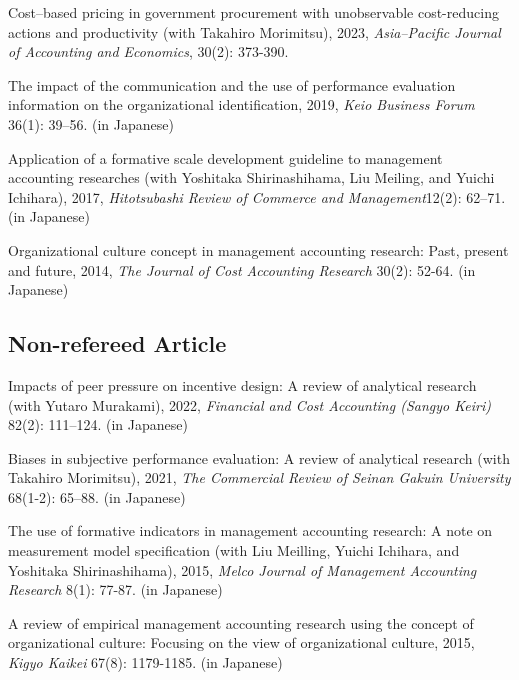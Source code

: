 \documentclass[letterpaper,uplatex]{article}
\renewenvironment{itemize}{
  \begin{list}{}{
    \setlength{\leftmargin}{1.5em}
  }
}{
  \end{list}
}
\begin{document}
\begin{itemize}
    \item Cost--based pricing in government procurement with unobservable cost-reducing actions and productivity (with Takahiro Morimitsu), 2023, \textit{Asia--Pacific Journal of Accounting and Economics}, 30(2): 373-390.
    
    \item The impact of the communication and the use of performance evaluation information on the organizational identification, 2019, \textit{Keio Business Forum} 36(1): 39--56. (in Japanese)

	\item Application of a formative scale development guideline to management accounting researches (with Yoshitaka Shirinashihama, Liu Meiling, and Yuichi Ichihara), 2017, \textit{Hitotsubashi Review of Commerce and Management}12(2): 62--71. (in Japanese)

	\item Organizational culture concept in management accounting research: Past, present and future, 2014, \textit{The Journal of Cost Accounting Research} 30(2): 52-64. (in Japanese)
\end{itemize}

\subsection*{Non-refereed Article}

\begin{itemize}
    \item Impacts of peer pressure on incentive design: A review of analytical research (with Yutaro Murakami), 2022, \textit{Financial and Cost Accounting (Sangyo Keiri)} 82(2): 111--124. (in Japanese)

    \item Biases in subjective performance evaluation: A review of analytical research (with Takahiro Morimitsu), 2021, \textit{The Commercial Review of Seinan Gakuin University} 68(1-2): 65--88. (in Japanese)
    
	\item The use of formative indicators in management accounting research: A note on measurement model specification (with Liu Meilling, Yuichi Ichihara, and Yoshitaka Shirinashihama), 2015, \textit{Melco Journal of Management Accounting Research} 8(1): 77-87. (in Japanese)

	\item A review of empirical management accounting research using the concept of organizational culture: Focusing on the view of organizational culture, 2015, \textit{Kigyo Kaikei} 67(8): 1179-1185. (in Japanese)
\end{itemize}
\end{document}

